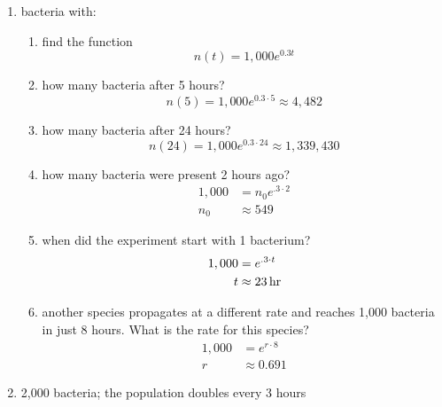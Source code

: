 \documentclass{exam}
\begin{document}
  \begin{enumerate}
    \item bacteria with:

      \begin{enumerate}[a]
        \item find the function 
          \[
            n(t) = 1,000 e^{0.3 t}
          \]

        \item how many bacteria after 5 hours? 
          \[
            n(5) = 1,000 e^{0.3 \cdot 5} \approx 4,482
          \]

        \item how many bacteria after 24 hours? 
          \[
            n(24) = 1,000 e^{0.3 \cdot 24} \approx 1,339,430
          \]

        \item how many bacteria were present 2 hours ago? 
          \begin{align*}
            1,000 & = n_0 e^{.3 \cdot 2} \\
            n_0   & \approx 549
          \end{align*}

        \item when did the experiment start with 1 bacterium?
          \begin{align*}
            1,000 & = e^{.3 \cdot t} \\
            t     & \approx \unit[23]{hr}
          \end{align*}

        \item another species propagates at a different rate and reaches 1,000 bacteria in just 8 hours.  What is the
          rate for this species?
          \begin{align*}
            1,000 & = e^{r \cdot 8} \\
            r     & \approx 0.691
          \end{align*}

      \end{enumerate}

    \item 2,000 bacteria; the population doubles every 3 hours
      

\end{enumerate}
\end{document}

